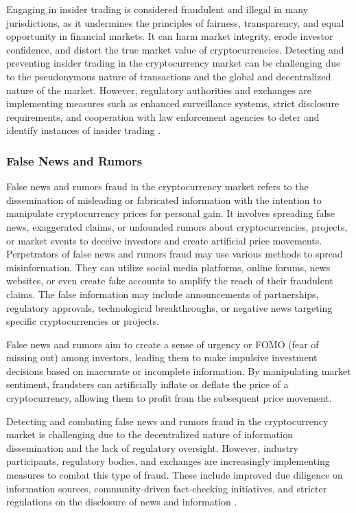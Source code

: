 Engaging in insider trading is considered fraudulent and illegal in many jurisdictions, as it undermines the principles of fairness, transparency, and
equal opportunity in financial markets. It can harm market integrity, erode investor confidence, and distort the true market value of cryptocurrencies.
Detecting and preventing insider trading in the cryptocurrency market can be challenging due to the pseudonymous nature of transactions and the global
and decentralized nature of the market. However, regulatory authorities and exchanges are implementing measures such as enhanced surveillance systems,
strict disclosure requirements, and cooperation with law enforcement agencies to deter and identify instances of insider trading
\cite{chai2019insider, liu2020detecting}.

\subsubsection{False News and Rumors}
False news and rumors fraud in the cryptocurrency market refers to the dissemination of misleading or fabricated information with the intention to
manipulate cryptocurrency prices for personal gain. It involves spreading false news, exaggerated claims, or unfounded rumors about cryptocurrencies,
projects, or market events to deceive investors and create artificial price movements. Perpetrators of false news and rumors fraud may use various
methods to spread misinformation. They can utilize social media platforms, online forums, news websites, or even create fake accounts to amplify the
reach of their fraudulent claims. The false information may include announcements of partnerships, regulatory approvals, technological breakthroughs,
or negative news targeting specific cryptocurrencies or projects.

False news and rumors aim to create a sense of urgency or FOMO (fear of missing out) among investors, leading them to make impulsive
investment decisions based on inaccurate or incomplete information. By manipulating market sentiment, fraudsters can artificially inflate or deflate
the price of a cryptocurrency, allowing them to profit from the subsequent price movement.

Detecting and combating false news and rumors fraud in the cryptocurrency market is challenging due to the decentralized nature of information
dissemination and the lack of regulatory oversight. However, industry participants, regulatory bodies, and exchanges are increasingly implementing
measures to combat this type of fraud. These include improved due diligence on information sources, community-driven fact-checking initiatives, and
stricter regulations on the disclosure of news and information \cite{yang2021spreading, feng2020cryptocurrency}.